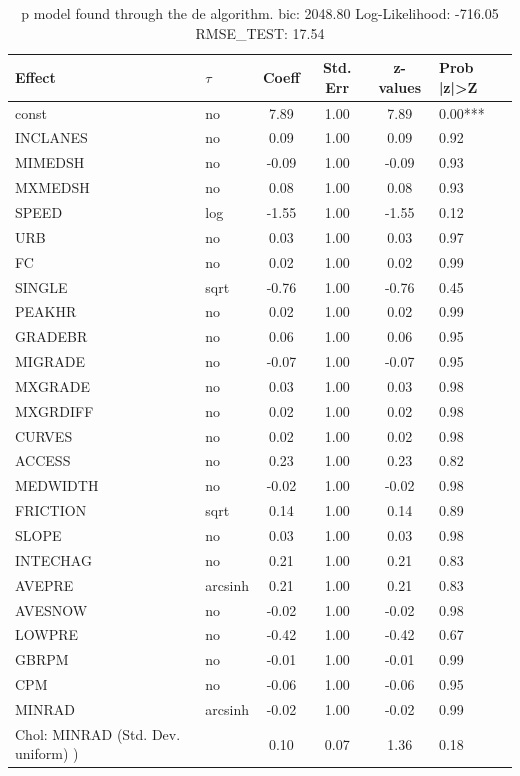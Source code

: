 \begin{table}
	\caption{p model found through the de algorithm. bic: 2048.80 Log-Likelihood: -716.05 RMSE_TEST: 17.54}
	\begin{center}
		\begin{tabular}{|l|l|c|c|c|l|}
			\hline
			Effect & $\tau$ & Coeff & Std. Err & z-values & Prob |z|>Z \\
			\hline
			const & no & 7.89 & 1.00 & 7.89 & 0.00*** \\
			\hline
			INCLANES & no & 0.09 & 1.00 & 0.09 & 0.92 \\
			\hline
			MIMEDSH & no & -0.09 & 1.00 & -0.09 & 0.93 \\
			\hline
			MXMEDSH & no & 0.08 & 1.00 & 0.08 & 0.93 \\
			\hline
			SPEED & log & -1.55 & 1.00 & -1.55 & 0.12 \\
			\hline
			URB & no & 0.03 & 1.00 & 0.03 & 0.97 \\
			\hline
			FC & no & 0.02 & 1.00 & 0.02 & 0.99 \\
			\hline
			SINGLE & sqrt & -0.76 & 1.00 & -0.76 & 0.45 \\
			\hline
			PEAKHR & no & 0.02 & 1.00 & 0.02 & 0.99 \\
			\hline
			GRADEBR & no & 0.06 & 1.00 & 0.06 & 0.95 \\
			\hline
			MIGRADE & no & -0.07 & 1.00 & -0.07 & 0.95 \\
			\hline
			MXGRADE & no & 0.03 & 1.00 & 0.03 & 0.98 \\
			\hline
			MXGRDIFF & no & 0.02 & 1.00 & 0.02 & 0.98 \\
			\hline
			CURVES & no & 0.02 & 1.00 & 0.02 & 0.98 \\
			\hline
			ACCESS & no & 0.23 & 1.00 & 0.23 & 0.82 \\
			\hline
			MEDWIDTH & no & -0.02 & 1.00 & -0.02 & 0.98 \\
			\hline
			FRICTION & sqrt & 0.14 & 1.00 & 0.14 & 0.89 \\
			\hline
			SLOPE & no & 0.03 & 1.00 & 0.03 & 0.98 \\
			\hline
			INTECHAG & no & 0.21 & 1.00 & 0.21 & 0.83 \\
			\hline
			AVEPRE & arcsinh & 0.21 & 1.00 & 0.21 & 0.83 \\
			\hline
			AVESNOW & no & -0.02 & 1.00 & -0.02 & 0.98 \\
			\hline
			LOWPRE & no & -0.42 & 1.00 & -0.42 & 0.67 \\
			\hline
			GBRPM & no & -0.01 & 1.00 & -0.01 & 0.99 \\
			\hline
			CPM & no & -0.06 & 1.00 & -0.06 & 0.95 \\
			\hline
			MINRAD & arcsinh & -0.02 & 1.00 & -0.02 & 0.99 \\
			\hline
			 Chol: MINRAD (Std. Dev. uniform) ) &  & 0.10 & 0.07 & 1.36 & 0.18 \\
			\hline
		\end{tabular}
	\end{center}
\end{table}